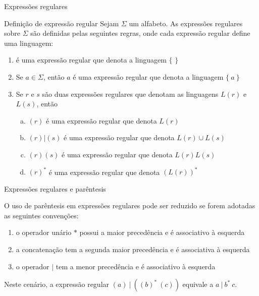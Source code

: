 \begin{frame}[fragile]{Expressões regulares}

    \begin{block}{Definição de expressão regular}
        Sejam $\Sigma$ um alfabeto. As expressões regulares sobre $\Sigma$ são definidas pelas seguintes regras, onde cada expressão regular define uma linguagem:
        \begin{enumerate}
            \item {} é uma expressão regular que denota a linguagem $\{$  $\}$
            \item Se $a\in\Sigma$, então $a$ é uma expressão regular que denota a linguagem $\{\ a\ \}$
            \item Se $r$ e $s$ são duas expressões regulares que denotam as linguagens $L(r)$ e  $L(s)$, então
            \begin{enumerate}[(a)]
                \item $(r)$ é uma expressão regular que denota $L(r)$
                \item $(r)|(s)$ é uma expressão regular que denota $L(r)\cup L(s)$
                \item $(r)(s)$ é uma expressão regular que denota $L(r)L(s)$
                \item $(r)^*$ é uma expressão regular que denota $(L(r))^*$
            \end{enumerate}
        \end{enumerate}
    \end{block}

\end{frame}

\begin{frame}[fragile]{Expressões regulares e parêntesis}

    O uso de parêntesis em expressões regulares pode ser reduzido se forem adotadas as seguintes convenções:

    \vspace{0.2in}

    \begin{enumerate}
        \item o operador unário $*$ possui a maior precedência e é associativo à esquerda

        \item a concatenação tem a segunda maior precedência e é associativa à esquerda

        \item o operador $|$ tem a menor precedência e é associativo à esquerda
    \end{enumerate}

    \vspace{0.2in}

    Neste cenário, a expressão regular $(a)\ |\ ((b)^*\ (c))$ equivale a $a\ |\ b^*\ c$.

\end{frame}

